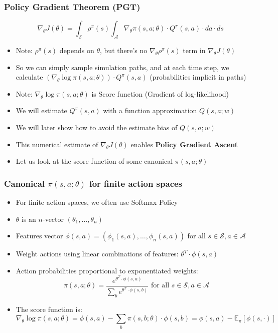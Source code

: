 \documentclass[handout]{beamer}
\begin{document}
\begin{frame}
\frametitle{Policy Gradient Theorem (PGT)}
\pause
\begin{theorem}
$$\nabla_{\theta} J(\theta) = \int_{\mathcal{S}} \rho^{\pi}(s) \int_{\mathcal{A}} \nabla_{\theta} \pi(s,a; \theta) \cdot Q^{\pi}(s,a) \cdot da \cdot ds$$
\end{theorem}
\pause
\begin{itemize}[<+->]
\item Note: $\rho^{\pi}(s)$ depends on $\theta$, but there's no $\nabla_{\theta} \rho^{\pi}(s)$ term in $\nabla_{\theta} J(\theta)$
\item So we can simply sample simulation paths, and at each time step, we calculate $(\nabla_{\theta} \log{\pi(s,a; \theta)}) \cdot Q^{\pi}(s,a)$ (probabilities implicit in paths)
\item Note: $\nabla_{\theta} \log{\pi(s,a; \theta)}$ is Score function (Gradient of log-likelihood)
\item We will estimate $Q^{\pi}(s,a)$ with a function approximation $Q(s,a;w)$
\item We will later show how to avoid the estimate bias of $Q(s,a;w)$
\item This numerical estimate of $\nabla_{\theta} J(\theta)$ enables {\bf Policy Gradient Ascent}
\item Let us look at the score function of some canonical $\pi(s,a; \theta)$
\end{itemize}
\end{frame}

\begin{frame}
\frametitle{Canonical $\pi(s,a;\theta)$ for finite action spaces}
\pause
\begin{itemize}[<+->]
\item For finite action spaces, we often use Softmax Policy
\item $\theta$ is an $n$-vector $(\theta_1, \ldots, \theta_n)$
\item Features vector $\phi(s,a) = (\phi_1(s,a), \ldots, \phi_n(s,a))$ for all $s \in \mathcal{S}, a \in \mathcal{A}$
\item Weight actions using linear combinations of features: $\theta^T \cdot \phi(s,a)$
\item Action probabilities proportional to exponentiated weights:
$$\pi(s,a;\theta) = \frac {e^{\theta^T \cdot \phi(s,a)}} {\sum_b e^{\theta^T \cdot \phi(s,b)}} \mbox{ for all } s \in \mathcal{S}, a \in \mathcal{A}$$
\item The score function is:
$$\nabla_{\theta} \log \pi(s,a;\theta) = \phi(s,a) - \sum_b \pi(s,b;\theta) \cdot \phi(s,b) = \phi(s,a) - \mathbb{E}_{\pi}[\phi(s,\cdot)]$$
\end{itemize}
\end{frame}
\end{document}
